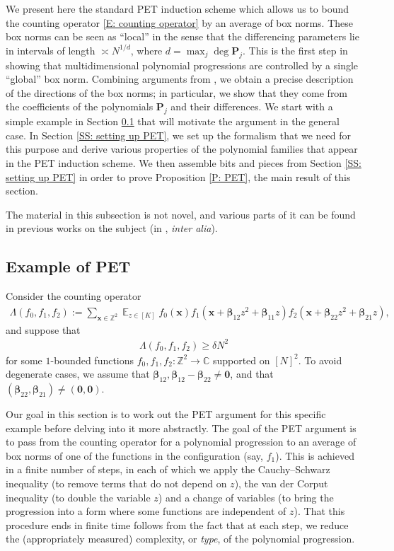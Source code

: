 \documentclass[11pt]{amsart}
\theoremstyle{definition}
\DeclareMathOperator*{\E}{\mathbb{E}}
\newcommand{\C}{{\mathbb C}}
\newcommand{\Z}{{\mathbb Z}}
\newcommand{\bp}{{\textbf{P}}}
\newcommand{\bx}{{\textbf{x}}}
\newcommand{\bbeta}{{\boldsymbol{\beta}}}
\begin{document}
We present here the standard PET induction scheme which allows us to bound the counting operator \eqref{E: counting operator} by an average of box norms. These box norms can be seen as ``local'' in the sense that the differencing parameters lie in intervals of length $\asymp N^{1/d}$, where $d = \max_j \deg \bp_j$. This is the first step in showing that multidimensional polynomial progressions are controlled by a single ``global'' box norm. Combining arguments from \cite{DFKS22, Ts22}, we obtain a precise description of the directions of the box norms; in particular, we show that they come from the coefficients of the polynomials $\bp_j$ and their differences. We start with a simple example in Section \ref{SS: example of PET} that will motivate the argument in the general case. In Section \ref{SS: setting up PET}, we set up the formalism that we need for this purpose and derive various properties of the polynomial families that appear in the PET induction scheme. We then assemble bits and pieces from Section \ref{SS: setting up PET} in order to prove Proposition \ref{P: PET}, the main result of this section.

The material in this subsection is not novel, and various parts of it can be found in previous works on the subject (in \cite{DFKS22, Pel20, Pre17, Ts22}, \emph{inter alia}).


\subsection{Example of PET}\label{SS: example of PET}
Consider the counting operator
\begin{align*}
    \Lambda(f_0, f_1, f_2) := \sum_{\bx\in\Z^2}\E_{z\in[K]}f_0(\bx)f_1(\bx + \bbeta_{12}z^2 + \bbeta_{11}z)f_2(\bx + \bbeta_{22}z^2 + \bbeta_{21}z),
\end{align*}
and suppose that 
\begin{align*}
    \Lambda(f_0, f_1, f_2)\geq \delta N^2
\end{align*}
for some $1$-bounded functions $f_0, f_1, f_2:\Z^2\to\C$ supported on $[N]^2$. To avoid degenerate cases, we assume that $\bbeta_{12}, \bbeta_{12}-\bbeta_{22}\neq \textbf{0}$, and that $(\bbeta_{22}, \bbeta_{21})\neq (\textbf{0}, \textbf{0})$.

Our goal in this section is to work out the PET argument for this specific example before delving into it more abstractly. The goal of the PET argument is to pass from the counting operator for a polynomial progression to an average of box norms of one of the functions in the configuration (say, $f_1$). This is achieved in a finite number of steps, in each of which we apply the Cauchy--Schwarz inequality (to remove terms that do not depend on $z$), the van der Corput inequality (to double the variable $z$) and a change of variables (to bring the progression into a form where some functions are independent of $z$). That this procedure ends in finite time follows from the fact that at each step, we reduce the (appropriately measured) complexity, or \textit{type}, of the polynomial progression.
\end{document}
